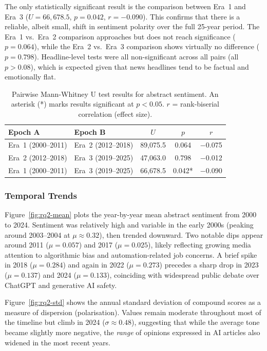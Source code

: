 The only statistically significant result is the comparison between Era~1
and Era~3 ($U = 66{,}678.5$, $p = 0.042$, $r = -0.090$). This confirms that
there is a reliable, albeit small, shift in sentiment polarity over the full
25-year period. The Era~1 vs.\ Era~2 comparison approaches but does not
reach significance ($p = 0.064$), while the Era~2 vs.\ Era~3 comparison
shows virtually no difference ($p = 0.798$). Headline-level tests were all
non-significant across all pairs (all $p > 0.08$), which is expected given
that news headlines tend to be factual and emotionally flat.

\begin{table}[t]
  \caption{Pairwise Mann-Whitney U test results for abstract sentiment. An
    asterisk (*) marks results significant at $p < 0.05$. $r$ = rank-biserial
    correlation (effect size).}
  \label{tab:rq2-tests}
  \small
  \begin{tabular}{llccc}
    \toprule
    Epoch A              & Epoch B              & $U$          & $p$    & $r$    \\
    \midrule
    Era~1 (2000--2011)   & Era~2 (2012--2018)   & 89,075.5     & 0.064  & $-$0.075 \\
    Era~2 (2012--2018)   & Era~3 (2019--2025)   & 47,063.0     & 0.798  & $-$0.012 \\
    Era~1 (2000--2011)   & Era~3 (2019--2025)   & 66,678.5     & 0.042* & $-$0.090 \\
    \bottomrule
  \end{tabular}
\end{table}

\subsubsection{Temporal Trends}

Figure~\ref{fig:rq2-mean} plots the year-by-year mean abstract sentiment
from 2000 to 2024. Sentiment was relatively high and variable in the early
2000s (peaking around 2003--2004 at $\mu \approx 0.32$), then trended
downward. Two notable dips appear around 2011 ($\mu = 0.057$) and
2017 ($\mu = 0.025$), likely reflecting growing media attention to
algorithmic bias and automation-related job concerns. A brief spike in
2018 ($\mu = 0.284$) and again in 2022 ($\mu = 0.273$) precedes a sharp
drop in 2023 ($\mu = 0.137$) and 2024 ($\mu = 0.133$), coinciding with
widespread public debate over ChatGPT and generative AI safety.

Figure~\ref{fig:rq2-std} shows the annual standard deviation of compound
scores as a measure of dispersion (polarisation). Values remain moderate
throughout most of the timeline but climb in 2024 ($\sigma \approx 0.48$),
suggesting that while the average tone became slightly more negative, the
\textit{range} of opinions expressed in AI articles also widened in the
most recent years.

